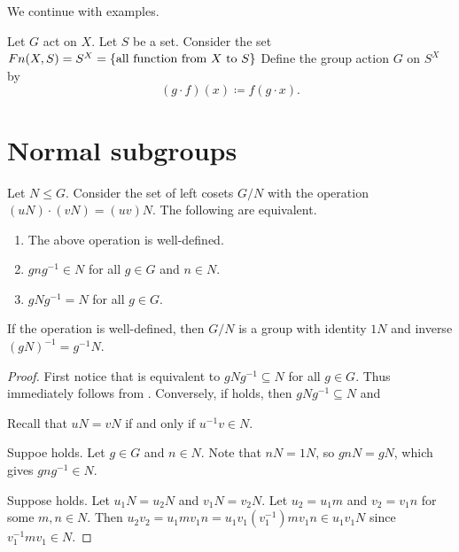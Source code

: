 We continue with examples.
\begin{examples}
    \item Let $G$ act on $X$.
    Let $S$ be a set.
    Consider the set $Fn(X, S) = S^X = \{\text{all function from } X
    \text{ to } S\}$
    Define the group action $G$ on $S^X$ by \[
        (g \cdot f)(x) \coloneq f(g \cdot x).
    \]
\end{examples}

\section{Normal subgroups} \label{sec:normal}
\begin{proposition*} \label{thm:normal}
    Let $N \le G$.
    Consider the set of left cosets $G/N$ with the operation
    $(uN) \cdot (vN) = (uv)N$.
    The following are equivalent.
    \begin{enumerate}
        \item \label{thm:normal:well}
            The above operation is well-defined.
        \item \label{thm:normal:in}
            $gng^{-1} \in N$ for all $g \in G$ and $n \in N$.
        \item \label{thm:normal:equals}
            $gNg^{-1} = N$ for all $g \in G$.
    \end{enumerate}
    If the operation is well-defined, then $G/N$ is a group
    with identity $1N$ and inverse $(gN)^{-1} = g^{-1}N$.
\end{proposition*}
\begin{proof}
    First notice that  is equivalent to
    $gNg^{-1} \subseteq N$ for all $g \in G$.
    Thus  immediately follows from
    .
    Conversely, if  holds, then
    $gNg^{-1} \subseteq N$ and

    Recall that $uN = vN$ if and only if $u^{-1}v \in N$.

    Suppoe  holds.
    Let $g \in G$ and $n \in N$.
    Note that $nN = 1N$, so $gnN = gN$, which gives $gng^{-1} \in N$.

    Suppose  holds.
    Let $u_1N = u_2N$ and $v_1N = v_2N$.
    Let $u_2 = u_1 m$ and $v_2 = v_1 n$ for some $m, n \in N$.
    Then $u_2v_2 = u_1mv_1n = u_1v_1(v_1^{-1})mv_1n \in u_1v_1 N$
    since $v_1^{-1}mv_1 \in N$.
\end{proof}

